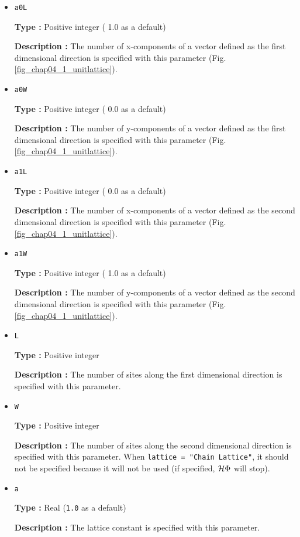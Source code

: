 \begin{itemize}

\item \verb|a0L|

{\bf Type :} Positive integer ( 1.0 as a default)

{\bf Description :} The number of x-components of a vector defined as the first dimensional direction
is specified with this parameter  (Fig. \ref{fig_chap04_1_unitlattice}).

\item \verb|a0W|

{\bf Type :} Positive integer ( 0.0 as a default)

{\bf Description :} The number of y-components of a vector defined as the first dimensional direction
is specified with this parameter (Fig. \ref{fig_chap04_1_unitlattice}).

\item \verb|a1L|

{\bf Type :} Positive integer ( 0.0 as a default)

{\bf Description :} The number of x-components of a vector defined as the second dimensional direction
is specified with this parameter (Fig. \ref{fig_chap04_1_unitlattice}).

\item \verb|a1W|

{\bf Type :} Positive integer ( 1.0 as a default)

{\bf Description :} The number of y-components of a vector defined as the second dimensional direction
is specified with this parameter (Fig. \ref{fig_chap04_1_unitlattice}).


\item \verb|L|

{\bf Type :} Positive integer

{\bf Description :} The number of
sites along the first dimensional direction
is specified with this parameter.

\item \verb|W|

{\bf Type :} Positive integer

{\bf Description :} The number of
sites along the second dimensional direction
is specified with this parameter.
When \verb|lattice = "Chain Lattice"|, 
it should not be specified because it will not be used
(if specified, $\mathcal{H} \Phi$ will stop).

\item \verb|a|

{\bf Type :} Real (\verb|1.0| as a default)

{\bf Description :} The lattice constant is specified with this parameter.
\end{itemize}

